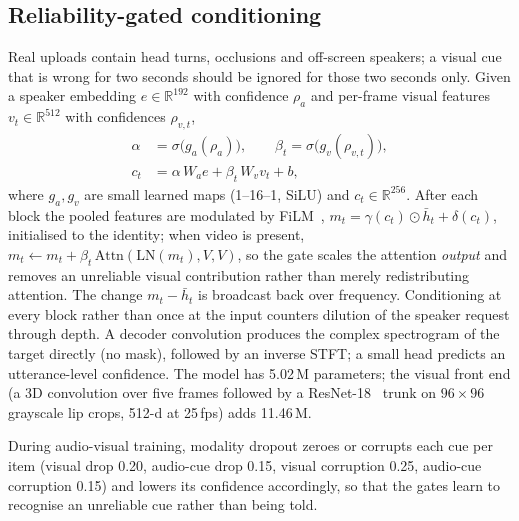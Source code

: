 \documentclass[conference]{IEEEtran}
\begin{document}
\subsection{Reliability-gated conditioning}
Real uploads contain head turns, occlusions and off-screen speakers; a visual cue that is wrong for two seconds should be ignored for those two seconds only. Given a speaker embedding $e\in\mathbb{R}^{192}$ with confidence $\rho_a$ and per-frame visual features $v_t\in\mathbb{R}^{512}$ with confidences $\rho_{v,t}$,
\begin{align}
\alpha &= \sigma\big(g_a(\rho_a)\big), \qquad \beta_t = \sigma\big(g_v(\rho_{v,t})\big), \label{eq:gates}\\
c_t &= \alpha\,W_a e + \beta_t\,W_v v_t + b, \label{eq:cond}
\end{align}
where $g_a,g_v$ are small learned maps (1--16--1, SiLU) and $c_t\in\mathbb{R}^{256}$. After each block the pooled features are modulated by FiLM~\cite{perez2018film}, $m_t=\gamma(c_t)\odot\bar{h}_t+\delta(c_t)$, initialised to the identity; when video is present, $m_t \leftarrow m_t + \beta_t\,\mathrm{Attn}(\mathrm{LN}(m_t), V, V)$, so the gate scales the attention \emph{output} and removes an unreliable visual contribution rather than merely redistributing attention. The change $m_t-\bar{h}_t$ is broadcast back over frequency. Conditioning at every block rather than once at the input counters dilution of the speaker request through depth. A decoder convolution produces the complex spectrogram of the target directly (no mask), followed by an inverse STFT; a small head predicts an utterance-level confidence. The model has 5.02\,M parameters; the visual front end (a 3D convolution over five frames followed by a ResNet-18~\cite{he2016resnet} trunk on $96{\times}96$ grayscale lip crops, 512-d at 25\,fps) adds 11.46\,M.

During audio-visual training, modality dropout zeroes or corrupts each cue per item (visual drop 0.20, audio-cue drop 0.15, visual corruption 0.25, audio-cue corruption 0.15) and lowers its confidence accordingly, so that the gates learn to recognise an unreliable cue rather than being told.
\end{document}
